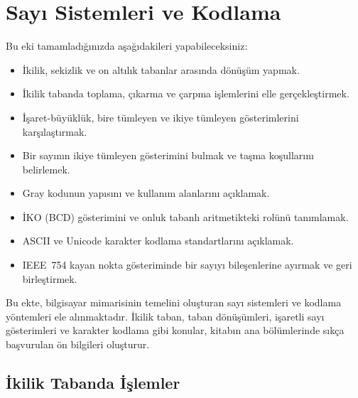 \chapter{Sayı Sistemleri ve Kodlama}
\label{ch:sayi-sistemleri}

\begin{tcolorbox}[
    colback=blokyesil!15,
    colframe=sinyalyesil!60!black,
    title={\textbf{Öğrenme Hedefleri}},
    fonttitle=\bfseries,
    rounded corners,
    boxrule=0.8pt
]
Bu eki tamamladığınızda aşağıdakileri yapabileceksiniz:
\begin{itemize}[nosep, leftmargin=*]
    \item İkilik, sekizlik ve on altılık tabanlar arasında dönüşüm yapmak.
    \item İkilik tabanda toplama, çıkarma ve çarpma işlemlerini elle gerçekleştirmek.
    \item İşaret-büyüklük, bire tümleyen ve ikiye tümleyen gösterimlerini karşılaştırmak.
    \item Bir sayının ikiye tümleyen gösterimini bulmak ve taşma koşullarını belirlemek.
    \item Gray kodunun yapısını ve kullanım alanlarını açıklamak.
    \item İKO (BCD) gösterimini ve onluk tabanlı aritmetikteki rolünü tanımlamak.
    \item ASCII ve Unicode karakter kodlama standartlarını açıklamak.
    \item IEEE~754 kayan nokta gösteriminde bir sayıyı bileşenlerine ayırmak ve geri birleştirmek.
\end{itemize}
\end{tcolorbox}

Bu ekte, bilgisayar mimarisinin temelini oluşturan sayı sistemleri ve kodlama yöntemleri ele alınmaktadır. İkilik taban, taban dönüşümleri, işaretli sayı gösterimleri ve karakter kodlama gibi konular, kitabın ana bölümlerinde sıkça başvurulan ön bilgileri oluşturur.

\section{İkilik Tabanda İşlemler}
\label{sec:ikilik-taban}

